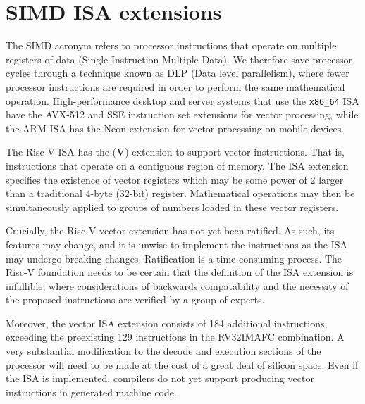 \documentclass[a4paper,8pt]{report}
\begin{document}


\section{SIMD ISA extensions}
The SIMD acronym refers to processor instructions that operate on multiple
registers of data (Single Instruction Multiple Data). We therefore save
processor cycles through a technique known as DLP (Data level parallelism),
where fewer processor instructions are required in order to perform the same
mathematical operation. High-performance desktop and server systems that use the
\texttt{x86\_64} ISA have the AVX-512 and SSE instruction set extensions\cite{x86-simd} for
vector processing, while the ARM ISA has the Neon extension for vector
processing on mobile devices.

The Risc-V ISA has the (\textbf{V}) extension to support vector instructions.
That is, instructions that operate on a contiguous region of memory. The ISA
extension specifies the existence of vector registers which may be some power of
2 larger than a traditional 4-byte (32-bit) register. Mathematical operations
may then be simultaneously applied to groups of numbers loaded in these vector
registers.

Crucially, the Risc-V vector extension\cite{riscv-v-spec} has not yet been ratified. As such, its
features may change, and it is unwise to implement the instructions as the ISA
may undergo breaking changes. Ratification is a time consuming process. The
Risc-V foundation needs to be certain that the definition of the ISA extension
is infallible, where considerations of backwards compatability and the necessity of
the proposed instructions are verified by a group of experts.

Moreover, the vector ISA extension consists of 184
additional instructions, exceeding the preexisting 129 instructions in the
RV32IMAFC combination. A very substantial modification to the decode and
execution sections of the processor will need to be made at the cost of a great
deal of silicon space. Even if the ISA is implemented, compilers do not yet
support producing vector instructions in generated machine code.
\end{document}
